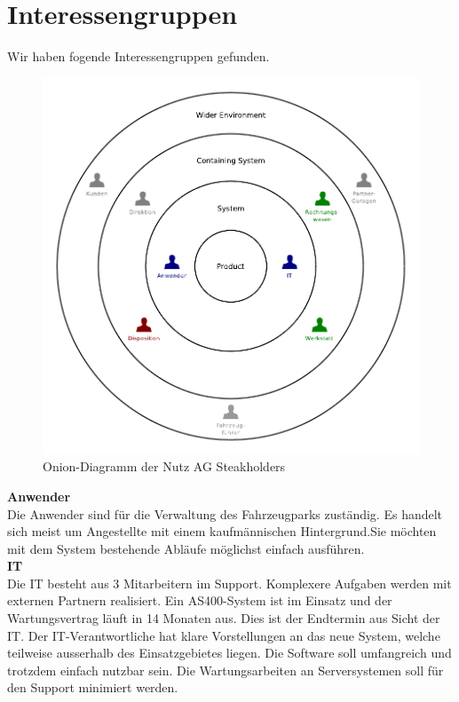 \section{Interessengruppen}
%
Wir haben fogende Interessengruppen gefunden.
\begin{center}
  \begin{figure}[ht]
    \includegraphics{graphics/onion.pdf}
    \caption{Onion-Diagramm der Nutz AG Steakholders}
    \label{fig:awesome_image}
  \end{figure}
\end{center}
%
\textbf{Anwender}\\
Die Anwender sind für die Verwaltung des Fahrzeugparks zuständig. Es handelt sich meist um Angestellte mit einem kaufmännischen Hintergrund.Sie möchten mit dem System bestehende Abläufe möglichst einfach ausführen. 
\\[6ex]
%
\textbf{IT}\\
Die IT besteht aus 3 Mitarbeitern im Support. Komplexere Aufgaben werden mit externen Partnern realisiert. Ein AS400-System ist im Einsatz und der Wartungsvertrag läuft in 14 Monaten aus. Dies ist der Endtermin aus Sicht der IT. Der IT-Verantwortliche hat klare Vorstellungen an das neue System, welche teilweise ausserhalb des Einsatzgebietes liegen. Die Software soll umfangreich und trotzdem einfach nutzbar sein. Die Wartungsarbeiten an Serversystemen soll für den Support minimiert werden.
